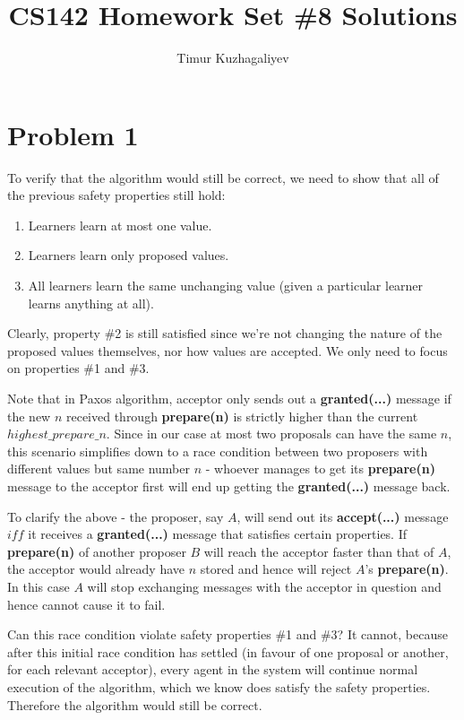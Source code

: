 \documentclass[10pt,letter]{article}
\begin{document}
\title{CS142 Homework Set \#8 Solutions}

\author{Timur Kuzhagaliyev}

 
\maketitle 

\section*{Problem 1}

To verify that the algorithm would still be correct, we need to show that all of the previous safety properties still hold:

\begin{enumerate}
\item Learners learn at most one value.
\item Learners learn only proposed values.
\item All learners learn the same unchanging value (given a particular learner learns anything at all).
\end{enumerate}

Clearly, property \#2 is still satisfied since we're not changing the nature of the proposed values themselves, nor how values are accepted. We only need to focus on properties \#1 and \#3.

Note that in Paxos algorithm, acceptor only sends out a \textbf{granted(...)} message if the new $n$ received through \textbf{prepare(n)} is strictly higher than the current $highest\_prepare\_n$. Since in our case at most two proposals can have the same $n$, this scenario simplifies down to a race condition between two proposers with different values but same number $n$ - whoever manages to get its \textbf{prepare(n)} message to the acceptor first will end up getting the \textbf{granted(...)} message back.

To clarify the above - the proposer, say $A$, will send out its \textbf{accept(...)} message $iff$ it receives a \textbf{granted(...)} message that satisfies certain properties. If \textbf{prepare(n)} of another proposer $B$ will reach the acceptor faster than that of $A$, the acceptor would already have $n$ stored and hence will reject $A$'s \textbf{prepare(n)}. In this case $A$ will stop exchanging messages with the acceptor in question and hence cannot cause it to fail. 

Can this race condition violate safety properties \#1 and \#3? It cannot, because after this initial race condition has settled (in favour of one proposal or another, for each relevant acceptor), every agent in the system will continue normal execution of the algorithm, which we know does satisfy the safety properties. Therefore the algorithm would still be correct.
\end{document}
